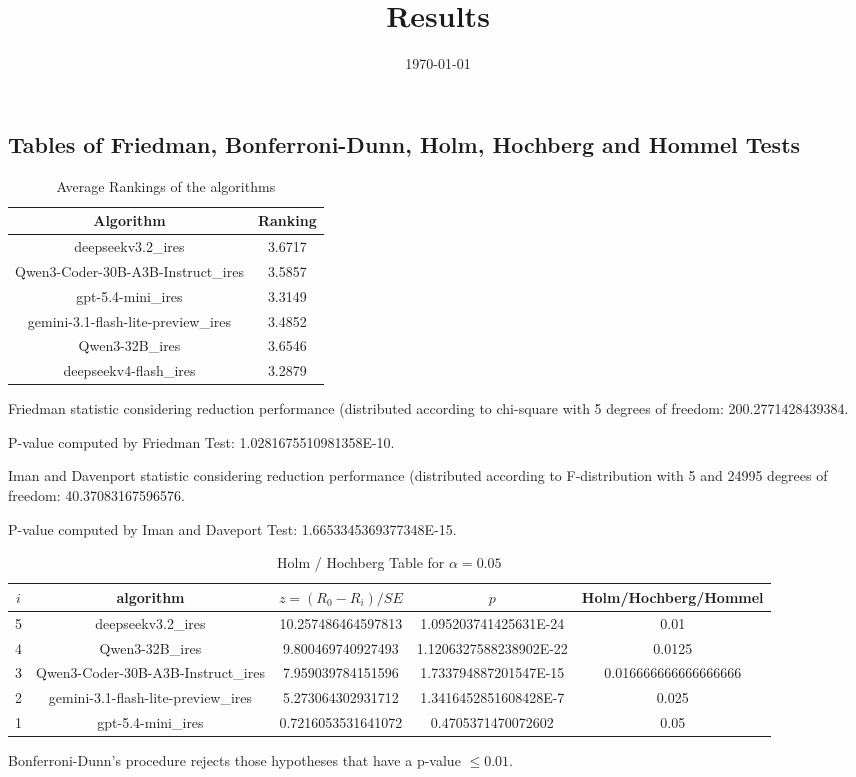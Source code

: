 \documentclass[a4paper,10pt]{article}
\title{Results}
\date{\today}
\begin{document}
\begin{landscape}
\oddsidemargin 0in \topmargin 0in\maketitle
\section{Tables of Friedman, Bonferroni-Dunn, Holm, Hochberg and Hommel Tests}
\begin{table}[!htp]
\centering
\caption{Average Rankings of the algorithms
}\begin{tabular}{c|c}
Algorithm&Ranking\\
\hline
deepseekv3.2_ires&3.6717\\
Qwen3-Coder-30B-A3B-Instruct_ires&3.5857\\
gpt-5.4-mini_ires&3.3149\\
gemini-3.1-flash-lite-preview_ires&3.4852\\
Qwen3-32B_ires&3.6546\\
deepseekv4-flash_ires&3.2879\\
\end{tabular}
\end{table}


Friedman statistic considering reduction performance (distributed according to chi-square with 5 degrees of freedom: 200.2771428439384.


P-value computed by Friedman Test: 1.0281675510981358E-10.\newline

Iman and Davenport statistic considering reduction performance (distributed according to F-distribution with 5 and 24995 degrees of freedom: 40.37083167596576.


P-value computed by Iman and Daveport Test: 1.6653345369377348E-15.\newline

\begin{table}[!htp]
\centering\tiny
\caption{Holm / Hochberg Table for $\alpha=0.05$}
\begin{tabular}{ccccc}
$i$&algorithm&$z=(R_0 - R_i)/SE$&$p$&Holm/Hochberg/Hommel\\
\hline
5&deepseekv3.2_ires&10.257486464597813&1.095203741425631E-24&0.01\\
4&Qwen3-32B_ires&9.800469740927493&1.1206327588238902E-22&0.0125\\
3&Qwen3-Coder-30B-A3B-Instruct_ires&7.959039784151596&1.733794887201547E-15&0.016666666666666666\\
2&gemini-3.1-flash-lite-preview_ires&5.273064302931712&1.3416452851608428E-7&0.025\\
1&gpt-5.4-mini_ires&0.7216053531641072&0.4705371470072602&0.05\\
\hline
\end{tabular}
\end{table}
Bonferroni-Dunn's procedure rejects those hypotheses that have a p-value $\le0.01$.



\end{landscape}
\end{document}
